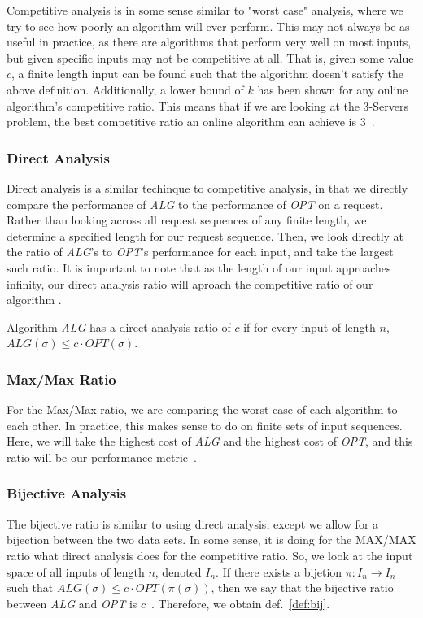 Competitive analysis is in some sense similar to "worst case" analysis, where we try to see how poorly an algorithm will ever perform. This may not always be as useful in practice, as there are algorithms that perform very well on most inputs, but given specific inputs may not be competitive at all. That is, given some value $c$, a finite length input can be found such that the algorithm doesn't satisfy the above definition. Additionally, a lower bound of $k$ has been shown for any online algorithm's competitive ratio. This means that if we are looking at the 3-Servers problem, the best competitive ratio an online algorithm can achieve is 3~\cite{OnlineComp1998}. 

\subsubsection*{Direct Analysis}
\label{sec:Direct}
Direct analysis is a similar techinque to competitive analysis, in that we directly compare the performance of \textit{ALG} to the performance of \textit{OPT} on a request. Rather than looking across all request sequences of any finite length, we determine a specified length for our request sequence. Then, we look directly at the ratio of \textit{ALG}'s to \textit{OPT}'s performance for each input, and take the largest such ratio. It is important to note that as the length of our input approaches infinity, our direct analysis ratio will aproach the competitive ratio of our algorithm .

\begin{definition}
    \label{def:direct}
    Algorithm \textit{ALG} has a direct analysis ratio of $c$ if for every input \s of length $n$, $ALG(\sigma) \leq c\cdot OPT(\sigma)$.
\end{definition}

\subsubsection*{Max/Max Ratio}
\label{sec:MaxMax}
For the Max/Max ratio, we are comparing the worst case of each algorithm to each other. In practice, this makes sense to do on finite sets of input sequences. Here, we will take the highest cost of \textit{ALG} and the highest cost of \textit{OPT}, and this ratio will be our performance metric~\cite{MAXMAX2005}. 

\subsubsection*{Bijective Analysis}
\label{sec:Bij}
The bijective ratio is similar to using direct analysis, except we allow for a bijection between the two data sets. In some sense, it is doing for the MAX/MAX ratio what direct analysis does for the competitive ratio. So, we look at the input space of all inputs of length $n$, denoted $I_n$. If there exists a bijetion $\pi:I_n \rightarrow I_n$ such that $ALG(\sigma) \leq c\cdot OPT(\pi(\sigma))$, then  we say that the bijective ratio between \textit{ALG} and \textit{OPT} is $c$~\cite{bij2016}. Therefore, we obtain def.~\ref{def:bij}. 

